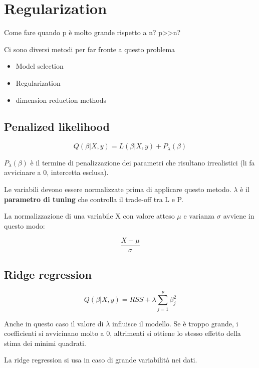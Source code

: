 \newpage

\section{Regularization}

Come fare quando p è molto grande rispetto a n? p>>n?

Ci sono diversi metodi per far fronte a questo problema

\begin{itemize}
 \item Model selection
 \item Regularization
 \item dimension reduction methods
\end{itemize}

\subsection{Penalized likelihood}

\begin{equation}
Q(\beta|X,y) = L(\beta|X,y) + P_{\lambda}(\beta)
\end{equation}

$P_{\lambda}(\beta)$ è il termine di penalizzazione dei parametri
che risultano irrealistici (li fa avvicinare a 0, intercetta
esclusa).

Le variabili devono essere normalizzate prima di applicare questo
metodo. $\lambda$ è il \textbf{parametro di tuning} che controlla
il trade-off tra L e P.

La normalizzazione di una variabile X con valore atteso $\mu$ e
varianza $\sigma$ avviene in questo modo:

\begin{equation}
\frac{X-\mu}{\sigma}
\end{equation}

\subsection{Ridge regression}

\begin{equation}
Q(\beta|X,y) = RSS + \lambda \sum_{j = 1}^p \beta_j ^2
\end{equation}

Anche in questo caso il valore di $\lambda$ influisce
il modello. Se è troppo grande, i coefficienti si avvicinano
molto a 0, altrimenti si ottiene lo stesso effetto della stima
dei minimi quadrati.

La ridge regression si usa in caso di grande variabilità nei
dati.
